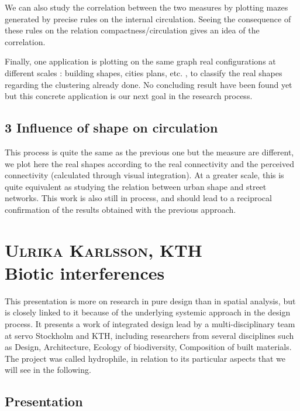 \documentclass[english]{article}
\newcommand{\noun}[1]{\textsc{#1}}
\begin{document}
\bigskip{}


We can also study the correlation between the two measures by plotting
mazes generated by precise rules on the internal circulation. Seeing
the consequence of these rules on the relation compactness/circulation
gives an idea of the correlation.

\bigskip{}


Finally, one application is plotting on the same graph real configurations
at different scales : building shapes, cities plans, etc. , to classify
the real shapes regarding the clustering already done. No concluding
result have been found yet but this concrete application is our next
goal in the research process.


\subsection*{3 Influence of shape on circulation}

This process is quite the same as the previous one but the measure
are different, we plot here the real shapes according to the real
connectivity and the perceived connectivity (calculated through visual
integration). At a greater scale, this is quite equivalent as studying
the relation between urban shape and street networks. This work is
also still in process, and should lead to a reciprocal confirmation
of the results obtained with the previous approach.

\newpage{}


\section*{\noun{Ulrika Karlsson}, KTH\protect \\
Biotic interferences}

This presentation is more on research in pure design than in spatial
analysis, but is closely linked to it because of the underlying systemic
approach in the design process. It presents a work of integrated design
lead by a multi-disciplinary team at servo Stockholm and KTH, including
researchers from several disciplines such as Design, Architecture,
Ecology of biodiversity, Composition of built materials. The project
was called hydrophile, in relation to its particular aspects that
we will see in the following.


\subsection*{Presentation}
\end{document}
